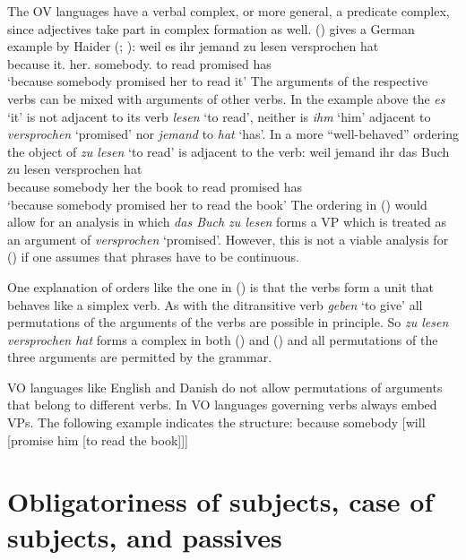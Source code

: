 The OV languages have a verbal complex, or more general, a predicate complex, since adjectives take
part in complex formation as well. () gives a German example by Haider (\citeyear[]{Haider86c}; \citeyear[]{Haider90b}):
\ea
\gll weil es ihr jemand zu lesen versprochen hat\\
     because it.\ACC{} her.\DAT{} somebody.\NOM{} to read promised has\\\german
\glt `because somebody promised her to read it'
\z
The arguments of the respective verbs can be mixed with arguments of other verbs. In the example
above the \emph{es} `it' is not adjacent to its verb \emph{lesen} `to read', neither is \emph{ihm}
`him' adjacent to \emph{versprochen} `promised' nor \emph{jemand} to \emph{hat} `has'. In a more
``well-behaved'' ordering the object of \emph{zu lesen} `to read' is adjacent to the verb:
\ea
\gll weil    jemand   ihr das Buch zu lesen versprochen hat\\
     because somebody her the book to read  promised    has\\
\glt `because somebody promised her to read the book'
\z
The ordering in () would allow for an analysis in which \emph{das Buch zu lesen} forms a VP
which is treated as an argument of \emph{versprochen} `promised'. However, this is not a viable
analysis for () if one assumes that phrases have to be continuous.

One explanation of orders like the one in () is that the verbs form a unit that behaves like a simplex verb. As with
the ditransitive verb \emph{geben} `to give' all permutations of the arguments of the verbs are
possible in principle. So \emph{zu lesen versprochen hat} forms a complex in both () and
() and all permutations of the three arguments are permitted by the grammar.

VO languages like English and Danish do not allow permutations of arguments that belong to different
verbs. In VO languages governing verbs always embed VPs. The following example indicates the
structure:
\ea
because somebody [will [promise him [to read the book]]]
\z



\section{Obligatoriness of subjects, case of subjects, and passives}

